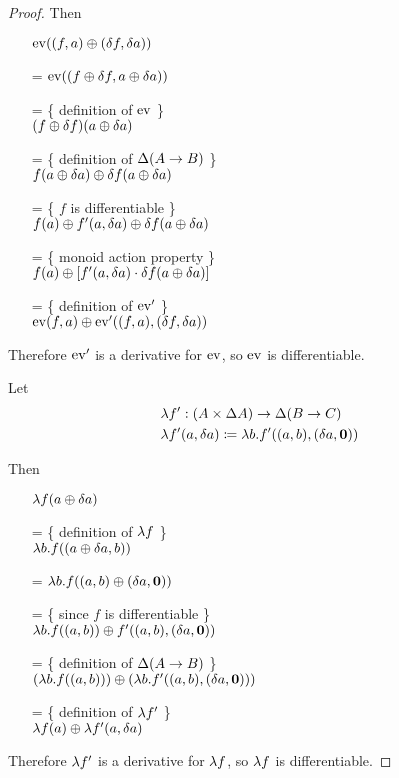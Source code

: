 \begin{proof}
  Then
  \begin{itemize}
    \item[ ]$\operatorname{ev}((f, a) \oplus (\delta f, \delta a))$
    \item[=]$\operatorname{ev}((f \oplus \delta f, a \oplus \delta a))$
    \item[=]\{ definition of $\operatorname{ev}$ \}\\
      $(f \oplus \delta f)(a \oplus \delta a)$
    \item[=]\{ definition of $\Delta (A \rightarrow B)$ \}\\
      $f(a \oplus \delta a) \oplus \delta f(a \oplus \delta a)$
    \item[=]\{ $f$ is differentiable \}\\
      $f(a) \oplus f'(a, \delta a) \oplus \delta f(a \oplus \delta a)$
    \item[=]\{ monoid action property \}\\
      $f(a) \oplus \left[ f'(a, \delta a) \cdot \delta f(a \oplus \delta a)\right]$
    \item[=]\{ definition of $\operatorname{ev}'$ \}\\
      $\operatorname{ev}(f, a) \oplus \operatorname{ev}'((f, a), (\delta f, \delta a))$
  \end{itemize}
  Therefore $\operatorname{ev}'$ is a derivative for $\operatorname{ev}$, so $\operatorname{ev}$ is differentiable.

  Let
  \begin{align*}
    &\lambda f' : (A \times \Delta A) \rightarrow \Delta (B \rightarrow C)\\
    &\lambda f'(a, \delta a) \coloneqq \lambda b. f'((a, b),
      (\delta a, \textbf{0}))
  \end{align*}

  Then
  \begin{itemize}
    \item[ ]$\lambda f(a \oplus \delta a)$
    \item[=]\{ definition of $\lambda f$ \}\\
      $\lambda b. f((a \oplus \delta a, b))$
    \item[=] $\lambda b. f((a, b) \oplus (\delta a, \textbf{0}))$
    \item[=]\{ since $f$ is differentiable \}\\
      $\lambda b. f((a, b)) \oplus f'((a, b), (\delta a, \textbf{0}))$
    \item[=]\{ definition of $\Delta (A \rightarrow B)$ \}\\
      $(\lambda b. f((a, b))) \oplus (\lambda b. f'((a, b), (\delta a, \textbf{0})))$
    \item[=]\{ definition of $\lambda f'$ \}\\
      $\lambda f(a) \oplus \lambda f'(a, \delta a)$
  \end{itemize}

  Therefore $\lambda f'$ is a derivative for $\lambda f$, so $\lambda f$
  is differentiable.
\end{proof}
\fi

